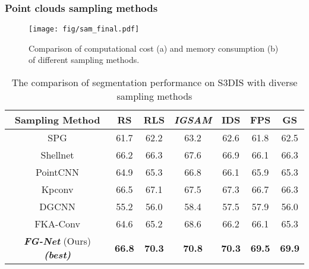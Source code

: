 \documentclass[journal]{IEEEtran}
\begin{document}
\subsubsection{Point clouds sampling methods}
\begin{figure}[htbp!]
\centering
\texttt{[image: fig/sam\_final.pdf]}
\caption{Comparison of computational cost (a) and memory consumption (b) of different sampling methods.}
\label{fig_comp}
\vspace{-7mm}
\end{figure}
\begin{table}[htbp!]

\caption{The comparison of segmentation performance on S3DIS with diverse sampling methods}
\label{table_sampling}
\begin{center}
\begin{tabular}{ccccccc}
\toprule


Sampling Method & RS & RLS & \textit{\textbf{IGSAM}} & IDS & FPS & GS\\

\hline
SPG\cite{landrieu2019point}&61.7&62.2&63.2&62.6&61.8&62.5\\ 

Shellnet\cite{zhang2019shellnet}&66.2&66.3&67.6&66.9&66.1&66.3\\

PointCNN\cite{wu2019pointconv}&64.9&65.3&66.8&66.1&65.9&65.3\\

Kpconv\cite{thomas2019kpconv}&66.5&67.1&67.5&67.3&66.7&66.3\\

DGCNN\cite{wang2019dynamic}&55.2&56.0&58.4&57.5&57.9&56.0\\
FKA-Conv\cite{boulch2020fka}&64.6&65.2&68.6&66.2&66.1&65.3\\
\textbf{\textit{FG-Net}} (Ours) \textbf{\textit{(best)}}&\textbf{66.8}&\textbf{70.3}&\textbf{70.8}&\textbf{70.3}&\textbf{69.5}&\textbf{69.9}\\
\bottomrule
\end{tabular}
\end{center}
\end{table}
\end{document}
